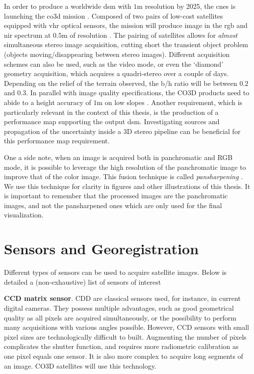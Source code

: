 In order to produce a worldwide \acrshort{dsm} with $1$m resolution by 2025, the \acrfull{cnes} is launching the \acrfull{co3d} mission \cite{melet_co3d_2020}. Composed of two pairs of low-cost satellites equipped with \acrshort{vhr} optical sensors, the mission will produce image in the \acrshort{rgb} and \acrshort{nir} spectrum at $0.5$m of resolution \cite{lebegue_co3d_2020}. The pairing of satellites allows for \textit{almost} simultaneous stereo image acquisition, cutting short the transient object problem (\ie objects moving/disappearing between stereo images). Different acquisition schemes can also be used, such as the video mode, or even the `diamond' geometry acquisition, which acquires a quadri-stereo over a couple of days. Depending on the relief of the terrain observed, the \acrshort{b/h} ratio will be between $0.2$ and $0.3$. In parallel with image quality specifications, the CO3D products need to abide to a height accuracy of $1$m on low slopes . Another requirement, which is particularly relevant in the context of this thesis, is the production of a performance map supporting the output \acrshort{dsm}. Investigating sources and propagation of the uncertainty inside a 3D stereo pipeline can be beneficial for this performance map requirement. 



One a side note, when an image is acquired both in panchromatic and RGB mode, it is possible to leverage the high resolution of the panchromatic image to improve that of the color image. This fusion technique is called \textit{pansharpening} \cite{loncan_hyperspectral_2015}. We use this technique for clarity in figures and other illustrations of this thesis. It is important to remember that the processed images are the panchromatic images, and not the pansharpened ones which are only used for the final visualization.

\section{Sensors and Georegistration}
Different types of sensors can be used to acquire satellite images. Below is detailed a (non-exhaustive) list of sensors of interest \cite{cnes_imagerie_2008}

\textbf{CCD matrix sensor}. CDD are classical sensors used, for instance, in current digital cameras. They possess multiple advantages, such as good geometrical quality as all pixels are acquired simultaneously, or the possibility to perform many acquisitions with various angles possible. However, CCD sensors with small pixel sizes are technologically difficult to built. Augmenting the number of pixels complicates the shutter function, and requires more radiometric calibration as one pixel equals one sensor. It is also more complex to acquire long segments of an image. CO3D satellites will use this technology.

